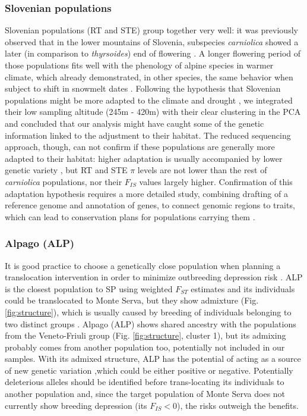 \documentclass[a4paper, 12pt]{report}
\begin{document}
\subsubsection{Slovenian populations}
Slovenian populations (RT and STE) group together very well: it was previously observed that in the lower mountains of Slovenia, subspecies \textit{carniolica} showed a later (in comparison to \textit{thyrsoides}) end of flowering \parencite{scheepensDifferentiationMorphologyFlowering2011}. A longer flowering period of those populations fits well with the phenology of alpine species in warmer climate, which already demonstrated, in other species, the same behavior when subject to shift in snowmelt dates \parencite{vorkaufFloweringPhenologyAlpine2021}. Following the hypothesis that Slovenian populations might be more adapted to the climate and drought \parencite{scheepensDifferentiationMorphologyFlowering2011}, we integrated their low sampling altitude (245m - 420m) with their clear clustering in the PCA and concluded that our analysis might have caught some of the genetic information linked to the adjustment to their habitat.  The reduced sequencing approach, though, can not confirm if these populations are generally more adapted to their habitat: higher adaptation is usually accompanied by lower genetic variety \parencite{habelBurdenGeneticDiversity2012}, but RT and STE $\pi$ levels are not lower than the rest of \textit{carniolica} populations, nor their $F_{IS}$ values largely higher. Confirmation of this adaptation hypothesis requires a more detailed study, combining drafting of a reference genome and annotation of genes, to connect genomic regions to traits, which can lead to conservation plans for populations carrying them \parencite{suppleConservationBiodiversityGenomics2018}.

\subsubsection{Alpago (ALP)}

It is good practice to choose a genetically close population when planning a translocation intervention in order to minimize outbreeding depression risk \parencite{yinPlantConservationAge2024}. ALP is the closest population to SP using weighted $F_{ST}$ estimates and its individuals could be translocated to Monte Serva, but they show admixture (Fig. \ref{fig:structure}), which is usually caused by breeding of individuals belonging to two distinct groups \parencite{suppleConservationBiodiversityGenomics2018}. Alpago (ALP) shows shared ancestry with the populations from the Veneto-Friuli group (Fig. \ref{fig:structure}, cluster 1), but its admixing probably comes from another population too, potentially not included in our samples. With its admixed structure, ALP has the potential of acting as a source of new genetic variation \parencite{suppleConservationBiodiversityGenomics2018},which could be either positive or negative. Potentially deleterious alleles should be identified before trans-locating its individuals to another population and, since the target population of Monte Serva does not currently show breeding depression (its $F_{IS} < 0$), the risks outweigh the benefits.
\end{document}
